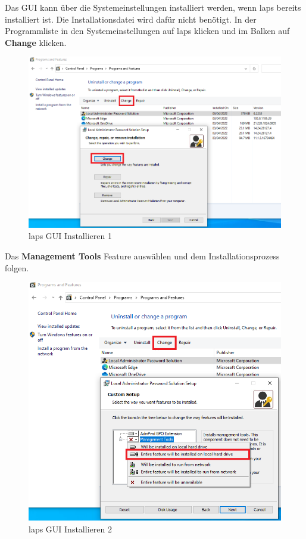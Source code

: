 Das GUI kann über die Systemeinstellungen installiert werden, wenn \acrshort{laps} bereits installiert ist.
Die Installationsdatei wird dafür nicht benötigt.
In der Programmliste in den Systemeinstellungen auf \acrshort{laps} klicken und im Balken auf \textbf{Change} klicken.
\begin{figure}[H]
    \centering
    \includegraphics[width=0.7\linewidth]{../img/LAPS/laps-ui-install.png}
    \caption{\acrshort{laps} GUI Installieren 1}
\end{figure}

Das \textbf{Management Tools} Feature auswählen und dem Installationsprozess folgen.
\begin{figure}[H]
    \centering
    \includegraphics[width=0.7\linewidth]{../img/LAPS/laps-ui-install-2.png}
    \caption{\acrshort{laps} GUI Installieren 2}
\end{figure}


